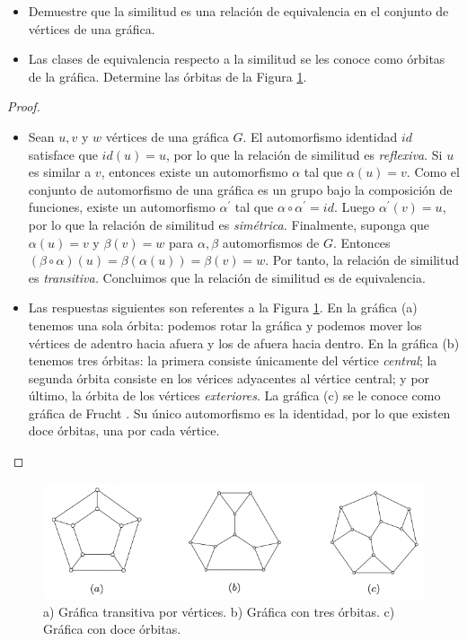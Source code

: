 \documentclass[12pt]{article}
\newenvironment{problem}[2][Problema]{\begin{trivlist}
\item[\hskip \labelsep {\bfseries #1}\hskip \labelsep {\bfseries #2.}]}{\end{trivlist}}
\begin{document}
\begin{problem}{1.2.13} \text{ }
\begin{itemize}
    \item[a)] Demuestre que la similitud es una relación de equivalencia en el conjunto de vértices de una gráfica.
    \item[b)] Las clases de equivalencia respecto a la similitud se les conoce como órbitas de la gráfica. Determine las órbitas de la Figura \ref{fig:fig3}.
\end{itemize}
\end{problem}
\begin{proof}
\text{ }
\begin{itemize}
    \item[a)] Sean $u,v$ y $w$ vértices de una gráfica $G$. El automorfismo identidad $id$ satisface que $id(u) = u$, por lo que la relación de similitud es \textit{reflexiva}. Si $u$ es similar a $v$, entonces existe un automorfismo $\alpha$ tal que $\alpha(u) = v$. Como el conjunto de automorfismo de una gráfica es un grupo bajo la composición de funciones, existe un automorfismo $\alpha^\prime$ tal que $\alpha \circ \alpha^\prime = id.$ Luego $\alpha^\prime(v) = u$, por lo que la relación de similitud es \textit{simétrica.} Finalmente, suponga que $\alpha(u) = v$ y $\beta(v) = w$ para $\alpha, \beta$ automorfismos de $G$. Entonces $(\beta \circ \alpha) (u) = \beta(\alpha(u)) = \beta(v) = w.$ Por tanto, la relación de similitud es \textit{transitiva.} Concluimos que la relación de similitud es de equivalencia.
    
    \item[b)] Las respuestas siguientes son referentes a la Figura \ref{fig:fig3}. En la gráfica (a) tenemos una sola órbita: podemos rotar la gráfica y podemos mover los vértices de adentro hacia afuera y los de afuera hacia dentro. En la gráfica (b) tenemos tres órbitas: la primera consiste únicamente del vértice \textit{central}; la segunda órbita consiste en los vérices adyacentes al vértice central; y por último, la órbita de los vértices \textit{exteriores}. La gráfica (c) se le conoce como gráfica de Frucht \cite{CM_1939__6__239_0}. Su único automorfismo es la identidad, por lo que existen doce órbitas, una por cada vértice. 
    
\end{itemize}
\end{proof}

\begin{figure}
    \centering
    \includegraphics[scale=0.70]{pics/graph1.png}
    \caption{a) Gráfica transitiva por vértices. b) Gráfica con tres órbitas. c) Gráfica con doce órbitas.}
    \label{fig:fig3}
\end{figure}
\end{document}
